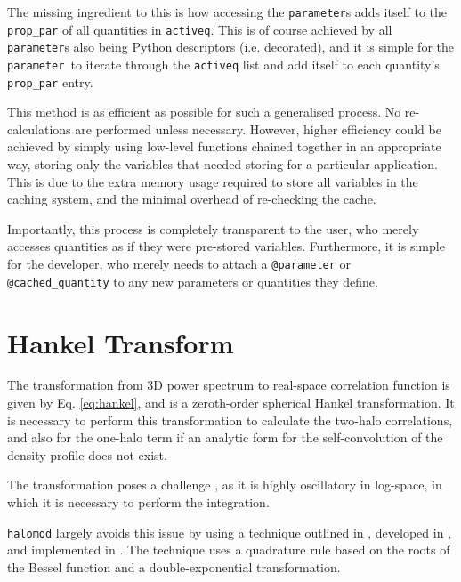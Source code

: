 \documentclass[5p,aas_macros]{elsarticle}
\newcommand{\parameter}{\texttt{parameter}}
\begin{document}
The missing ingredient to this is how accessing the \texttt{parameter}s adds itself to the \verb|prop_par| of all quantities in \verb|activeq|. This is of course achieved
by all \texttt{parameter}s also being Python descriptors (i.e. decorated), and it is simple for the \parameter\ to iterate through the \verb|activeq| list and add itself to each quantity's \verb|prop_par| entry.

This method is as efficient as possible for such a generalised process. No re-calculations are performed unless necessary. However, higher efficiency could be achieved by simply using low-level functions chained together in an appropriate way, storing only the variables that needed storing for a particular application. This is due to the extra memory usage required to store all variables in the caching system, and the minimal overhead of re-checking the cache. 

Importantly, this process is completely transparent to the user, who merely accesses quantities as if they were pre-stored variables. Furthermore, it is simple for the developer, who merely needs to attach a \verb|@parameter| or \verb|@cached_quantity| to any new parameters or quantities they define. 
\section{Hankel Transform}
 \label{app:hankel}

The transformation from 3D power spectrum to real-space correlation function is given by Eq. \ref{eq:hankel}, and is a zeroth-order spherical Hankel transformation.
It is necessary to perform this transformation to calculate the two-halo correlations, and also for the one-halo term if an analytic form for the self-convolution of the density profile does not exist. 

The transformation poses a challenge \citep[eg.][]{Diemer2018}, as it is highly oscillatory in log-space, in which it is necessary to perform the integration.

\verb|halomod| largely avoids this issue by using a technique outlined in \cite{Szapudi2005}, developed in \cite{Ogata2005}, and implemented in \cite{Murray2019}. 
The technique uses a quadrature rule based on the roots of the Bessel function and a double-exponential transformation. 
\end{document}
